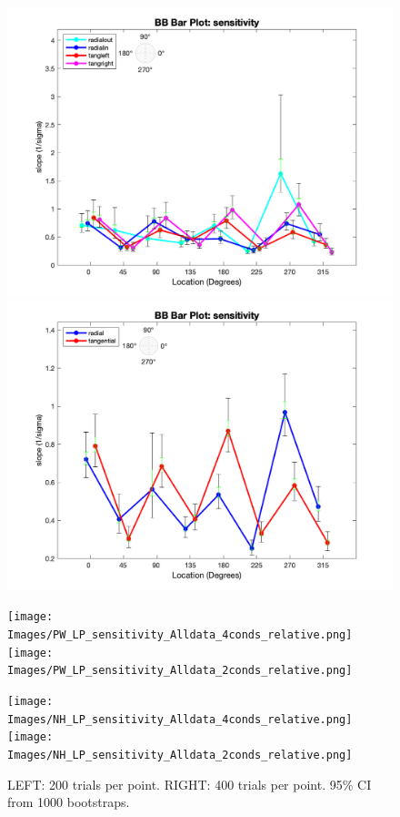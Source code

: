 \documentclass[11pt]{article} %
\begin{document}
\begin{figure}[H]
\centering %
\includegraphics[scale=.3]{Images/BB_LP_sensitivity_Alldata_4conds.png}
\includegraphics[scale=.3]{Images/BB_LP_sensitivity_Alldata_2conds.png}
\end{figure}
\begin{figure}[H]
\centering %
\texttt{[image: Images/PW\_LP\_sensitivity\_Alldata\_4conds\_relative.png]}
\texttt{[image: Images/PW\_LP\_sensitivity\_Alldata\_2conds\_relative.png]}
\end{figure}
\begin{figure}[H]
\centering %
\texttt{[image: Images/NH\_LP\_sensitivity\_Alldata\_4conds\_relative.png]}
\texttt{[image: Images/NH\_LP\_sensitivity\_Alldata\_2conds\_relative.png]}
\caption{LEFT: 200 trials per point. RIGHT: 400 trials per point. 95\% CI from 1000 bootstraps.}
\end{figure}
\end{document}
